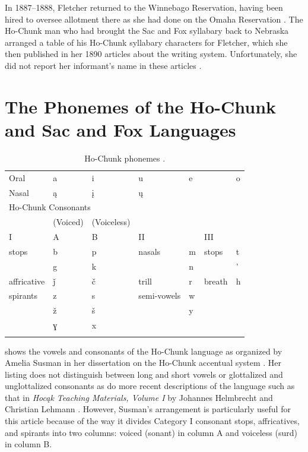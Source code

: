 \documentclass[output=paper]{LSP/langsci}
\begin{document}
In 1887--1888, Fletcher returned to the Winnebago Reservation, having been hired to oversee allotment there as she had done on the Omaha Reservation \citep[162]{Mark1988}. The Ho-Chunk man who had brought the Sac and Fox syllabary back to Nebraska arranged a table of his Ho-Chunk syllabary characters for Fletcher, which she then published in her 1890 articles about the writing system. Unfortunately, she did not report her informant's name in these articles \citep[300]{Fletcher1890a}.

\section{The Phonemes of the Ho-Chunk and Sac and Fox Languages}

\begin{table}
\begin{tabular}{lllllll}
\lsptoprule
\multicolumn{7}{l}{Ho-Chunk Vowels}\\
\midrule
Oral & a & i & u & e && o\\
Nasal & ą & į & ų\\
\midrule
\multicolumn{7}{l}{Ho-Chunk Consonants}\\
& (Voiced) & (Voiceless)\\
I & A & B & II & & III & \\
\midrule
stops & b & p & nasals & m & stops & t\\
& g & k && n && ' \\
affricative & ǰ & č & trill & r & breath & h\\
spirants & z & s & semi-vowels & w &&\\
& ž & š && y &&\\
& ɣ & x &&&&\\
\lspbottomrule
\end{tabular}
\caption{Ho-Chunk phonemes \citep[15]{Susman1943}.}
\label{hochunkphonemes}
\end{table}

 shows the vowels and consonants of the Ho-Chunk language as organized by Amelia Susman in her dissertation on the Ho-Chunk accentual system \citeyearpar[15]{Susman1943}. Her listing does not distinguish between long and short vowels or glottalized and unglottalized consonants as do more recent descriptions of the language such as that in \emph{Hoc\k{a}k Teaching Materials, Volume I} by Johannes Helmbrecht and Christian Lehmann \citeyearpar[5--7]{HelmbrechtLehmann2010}. However, Susman's arrangement is particularly useful for this article because of the way it divides Category I consonant stops, affricatives, and spirants into two columns: voiced (sonant) in column A and voiceless (surd) in column B. 
\end{document}
